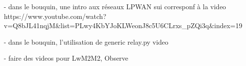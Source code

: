 - dans le bouquin, une intro aux réseaux LPWAN sui corresponf à la video 
https://www.youtube.com/watch?v=Q8bJL41nqjM&list=PLwy4KbYJoKLWeonJ8c5U6CLrxs_pZQi3q&index=19

- dans le bouquin, l'utilisation de generic relay.py video

- faire des videos pour LwM2M2, Observe
